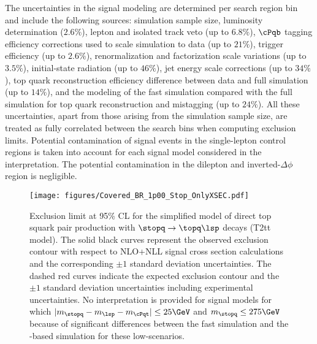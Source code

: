 The uncertainties in the signal modeling are determined per search region bin and include the following sources: 
simulation sample size, %
luminosity determination ($2.6\%$), lepton and isolated track veto (up to $6.8\%$), 
$\cPqb$ tagging efficiency corrections used to scale simulation to data (up to $21\%$), trigger efficiency (up to $2.6\%$), 
renormalization and factorization scale variations (up to $3.5\%$), initial-state radiation (up to $46\%$), 
jet energy scale corrections (up to $34\%$), top quark reconstruction efficiency difference between data and full simulation (up to $14\%$),
and the modeling of the fast simulation compared with the full simulation for top quark reconstruction and mistagging (up to $24\%$).  
All these uncertainties, apart from those arising from the simulation sample size, are treated as fully correlated between the search bins when computing exclusion limits. 
Potential contamination of signal events in the single-lepton control regions is taken into account for each signal model considered in the interpretation. 
The potential contamination in the dilepton and inverted-$\Delta\phi$ region is negligible. 


\begin{figure}[!t]
\centering
\texttt{[image: figures/Covered\_BR\_1p00\_Stop\_OnlyXSEC.pdf]}
\caption{ Exclusion limit at 95\% CL for the simplified model of direct top squark pair production with $\stopq \rightarrow \topq \lsp$ decays (T2tt model). 
The solid black curves represent the observed exclusion contour with respect to NLO+NLL signal cross section calculations~\cite{Borschensky:2014cia} and the corresponding $\pm 1$ standard deviation uncertainties. 
The dashed red curves indicate the expected exclusion contour and the $\pm 1$ standard deviation uncertainties including experimental uncertainties. 
No interpretation is provided for signal models for which $|m_{\stopq} - m_{\lsp} - m_{\cPqt}| \le 25\GeV$ and $m_{\stopq} \leq 275\GeV$
because of significant differences between the fast simulation and the \GEANTfour-based simulation for these low-\met scenarios. 
}
\label{fig:T2ttlimit}
\end{figure}

